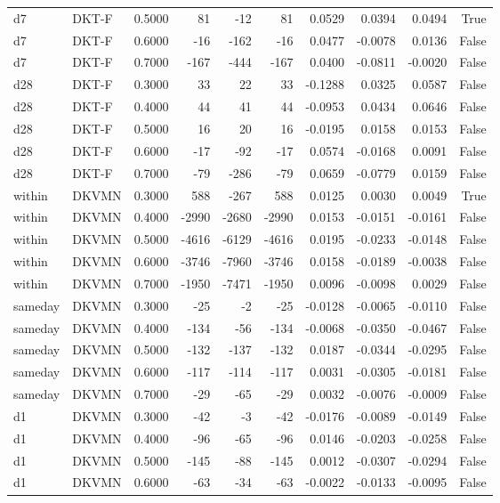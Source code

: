 \begin{tabular}{llrrrrrrrr}
d7 & DKT-F & 0.5000 & 81 & -12 & 81 & 0.0529 & 0.0394 & 0.0494 & True \\
d7 & DKT-F & 0.6000 & -16 & -162 & -16 & 0.0477 & -0.0078 & 0.0136 & False \\
d7 & DKT-F & 0.7000 & -167 & -444 & -167 & 0.0400 & -0.0811 & -0.0020 & False \\
d28 & DKT-F & 0.3000 & 33 & 22 & 33 & -0.1288 & 0.0325 & 0.0587 & False \\
d28 & DKT-F & 0.4000 & 44 & 41 & 44 & -0.0953 & 0.0434 & 0.0646 & False \\
d28 & DKT-F & 0.5000 & 16 & 20 & 16 & -0.0195 & 0.0158 & 0.0153 & False \\
d28 & DKT-F & 0.6000 & -17 & -92 & -17 & 0.0574 & -0.0168 & 0.0091 & False \\
d28 & DKT-F & 0.7000 & -79 & -286 & -79 & 0.0659 & -0.0779 & 0.0159 & False \\
within & DKVMN & 0.3000 & 588 & -267 & 588 & 0.0125 & 0.0030 & 0.0049 & True \\
within & DKVMN & 0.4000 & -2990 & -2680 & -2990 & 0.0153 & -0.0151 & -0.0161 & False \\
within & DKVMN & 0.5000 & -4616 & -6129 & -4616 & 0.0195 & -0.0233 & -0.0148 & False \\
within & DKVMN & 0.6000 & -3746 & -7960 & -3746 & 0.0158 & -0.0189 & -0.0038 & False \\
within & DKVMN & 0.7000 & -1950 & -7471 & -1950 & 0.0096 & -0.0098 & 0.0029 & False \\
sameday & DKVMN & 0.3000 & -25 & -2 & -25 & -0.0128 & -0.0065 & -0.0110 & False \\
sameday & DKVMN & 0.4000 & -134 & -56 & -134 & -0.0068 & -0.0350 & -0.0467 & False \\
sameday & DKVMN & 0.5000 & -132 & -137 & -132 & 0.0187 & -0.0344 & -0.0295 & False \\
sameday & DKVMN & 0.6000 & -117 & -114 & -117 & 0.0031 & -0.0305 & -0.0181 & False \\
sameday & DKVMN & 0.7000 & -29 & -65 & -29 & 0.0032 & -0.0076 & -0.0009 & False \\
d1 & DKVMN & 0.3000 & -42 & -3 & -42 & -0.0176 & -0.0089 & -0.0149 & False \\
d1 & DKVMN & 0.4000 & -96 & -65 & -96 & 0.0146 & -0.0203 & -0.0258 & False \\
d1 & DKVMN & 0.5000 & -145 & -88 & -145 & 0.0012 & -0.0307 & -0.0294 & False \\
d1 & DKVMN & 0.6000 & -63 & -34 & -63 & -0.0022 & -0.0133 & -0.0095 & False \\

\end{tabular}
